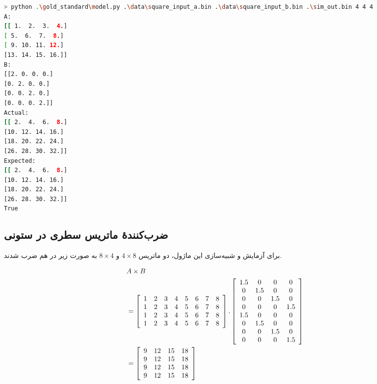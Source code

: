 \documentclass[conference]{IEEEtran-ModifiedForMVIP}
\begin{document}
\begin{latin}
\begin{lstlisting}[language=Bash]
> python .\gold_standard\model.py .\data\square_input_a.bin .\data\square_input_b.bin .\sim_out.bin 4 4 4
A:
[[ 1.  2.  3.  4.]
[ 5.  6.  7.  8.]
[ 9. 10. 11. 12.]
[13. 14. 15. 16.]]
B:
[[2. 0. 0. 0.]
[0. 2. 0. 0.]
[0. 0. 2. 0.]
[0. 0. 0. 2.]]
Actual:
[[ 2.  4.  6.  8.]
[10. 12. 14. 16.]
[18. 20. 22. 24.]
[26. 28. 30. 32.]]
Expected:
[[ 2.  4.  6.  8.]
[10. 12. 14. 16.]
[18. 20. 22. 24.]
[26. 28. 30. 32.]]
True
\end{lstlisting}
\end{latin}

\subsection{
    ضرب‌کنندهٔ ماتریس سطری در ستونی
}

برای آزمایش و شبیه‌سازی این ماژول، دو ماتریس
$4 \times 8$
و
$8 \times 4$
به صورت زیر در هم ضرب شدند.

\scriptsize
\begin{align*}
    &A \times B\\
    &=\left[
        \begin{array}{c c c c c c c c}
            1&2&3&4&5&6&7&8\\
            1&2&3&4&5&6&7&8\\
            1&2&3&4&5&6&7&8\\
            1&2&3&4&5&6&7&8
        \end{array}
    \right] . \left[
        \begin{array}{c c c c}
            1.5&0&0&0\\
            0&1.5&0&0\\
            0&0&1.5&0\\
            0&0&0&1.5\\
            1.5&0&0&0\\
            0&1.5&0&0\\
            0&0&1.5&0\\
            0&0&0&1.5
        \end{array}
    \right]\\
    &= \left[
        \begin{array}{c c c c}
            9&12&15&18\\
            9&12&15&18\\
            9&12&15&18\\
            9&12&15&18
        \end{array}
    \right]
\end{align*}
\normalsize
\end{document}
